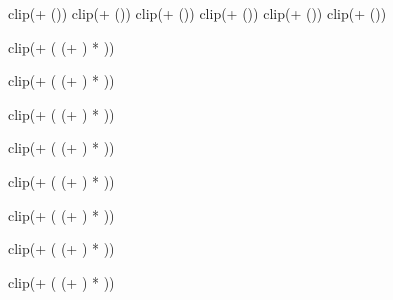 




\FPeval{\DndStrSave}
	{clip(\DndStrMod + (\DndIsProficientStr * \DndProficiencyMod))}
\FPeval{\DndDexSave}
	{clip(\DndDexMod + (\DndIsProficientDex * \DndProficiencyMod))}
\FPeval{\DndConSave}
	{clip(\DndConMod + (\DndIsProficientCon * \DndProficiencyMod))}
\FPeval{\DndIntSave}
	{clip(\DndIntMod + (\DndIsProficientInt * \DndProficiencyMod))}
\FPeval{\DndWisSave}
	{clip(\DndWisMod + (\DndIsProficientWis * \DndProficiencyMod))}
\FPeval{\DndChaSave}
	{clip(\DndChaMod + (\DndIsProficientCha * \DndProficiencyMod))}

\FPeval{\DndAcrobaticsMod}
{clip(\DndDexMod + (
	(\DndIsProficientAcrobatics + \DndIsExpertiseAcrobatics)
		 * \DndProficiencyMod))}

\FPeval{\DndAnimalHandlingMod}
{clip(\DndWisMod + (
	(\DndIsProficientAnimalHandling + \DndIsExpertiseAnimalHandling)
		 * \DndProficiencyMod))}

\FPeval{\DndArcanaMod}
{clip(\DndIntMod + (
	(\DndIsProficientArcana + \DndIsExpertiseArcana)
		 * \DndProficiencyMod))}

\FPeval{\DndAthleticsMod}
{clip(\DndStrMod + (
	(\DndIsProficientAthletics + \DndIsExpertiseAthletics)
		 * \DndProficiencyMod))}

\FPeval{\DndDeceptionMod}
{clip(\DndChaMod + (
	(\DndIsProficientDeception + \DndIsExpertiseDeception)
		 * \DndProficiencyMod))}

\FPeval{\DndHistoryMod}
{clip(\DndIntMod + (
	(\DndIsProficientHistory + \DndIsExpertiseHistory)
		 * \DndProficiencyMod))}

\FPeval{\DndInsightMod}
{clip(\DndWisMod + (
	(\DndIsProficientInsight + \DndIsExpertiseInsight)
		 * \DndProficiencyMod))}

\FPeval{\DndIntimidationMod}
{clip(\DndChaMod + (
	(\DndIsProficientIntimidation + \DndIsExpertiseIntimidation)
		 * \DndProficiencyMod))}

